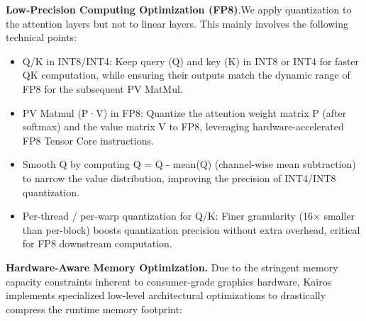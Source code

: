 \documentclass{llmxive}
\begin{document}
\textbf {Low-Precision Computing Optimization (FP8)}.We apply quantization to the attention layers but not to linear layers. This mainly involves the following technical points:

\begin{itemize}
    \item Q/K in INT8/INT4: Keep query (Q) and key (K) in INT8 or INT4 for faster QK computation, while ensuring their outputs match the dynamic range of FP8 for the subsequent PV MatMul.
    
	\item {PV Matmul (P·V) in FP8}: Quantize the attention weight matrix P (after softmax) and the value matrix V to FP8, leveraging hardware-accelerated FP8 Tensor Core instructions.
    
	\item Smooth Q by computing Q = Q - mean(Q) (channel-wise mean subtraction) to narrow the value distribution, improving the precision of INT4/INT8 quantization.
    
	\item Per-thread / per-warp quantization for Q/K: Finer granularity (16× smaller than per-block) boosts quantization precision without extra overhead, critical for FP8 downstream computation.
    
\end{itemize}    
     
\textbf{Hardware-Aware Memory Optimization.} Due to the stringent memory capacity constraints inherent to consumer-grade graphics hardware, Kairos implements specialized low-level architectural optimizations to drastically compress the runtime memory footprint:
\end{document}
